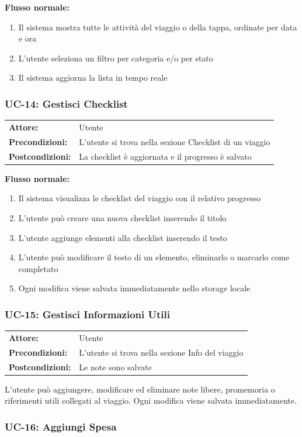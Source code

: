 \documentclass[12pt, a4paper]{article}
\makeatletter
\newcommand{\ucblock}[3]{%
  \noindent
  \begin{tabular}{@{}ll@{}}
    \textbf{Attore:}         & #1 \\
    \textbf{Precondizioni:}  & #2 \\
    \textbf{Postcondizioni:} & #3 \\
  \end{tabular}%
  \medskip
}
\makeatother
\begin{document}
\noindent\textbf{Flusso normale:}
\begin{enumerate}[leftmargin=1.5em, itemsep=1pt]
  \item Il sistema mostra tutte le attività del viaggio o della tappa, ordinate per data e ora
  \item L'utente seleziona un filtro per categoria e/o per stato
  \item Il sistema aggiorna la lista in tempo reale
\end{enumerate}

\subsubsection{UC-14: Gestisci Checklist}

\ucblock{Utente}{L'utente si trova nella sezione Checklist di un viaggio}{La checklist è aggiornata e il progresso è salvato}

\noindent\textbf{Flusso normale:}
\begin{enumerate}[leftmargin=1.5em, itemsep=1pt]
  \item Il sistema visualizza le checklist del viaggio con il relativo progresso
  \item L'utente può creare una nuova checklist inserendo il titolo
  \item L'utente aggiunge elementi alla checklist inserendo il testo
  \item L'utente può modificare il testo di un elemento, eliminarlo o marcarlo come completato
  \item Ogni modifica viene salvata immediatamente nello storage locale
\end{enumerate}

\subsubsection{UC-15: Gestisci Informazioni Utili}

\ucblock{Utente}{L'utente si trova nella sezione Info del viaggio}{Le note sono salvate}

\noindent L'utente può aggiungere, modificare ed eliminare note libere, promemoria o
riferimenti utili collegati al viaggio. Ogni modifica viene salvata immediatamente.

\subsubsection{UC-16: Aggiungi Spesa}
\end{document}
